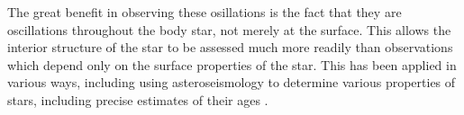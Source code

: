 \documentclass[11pt]{amsart}
\begin{document}
The great benefit in observing these osillations is the fact that they are oscillations throughout the body star, not merely at the surface.  This allows the interior structure of the star to be assessed much more readily than observations which depend only on the surface properties of the star.  This has been applied in various ways, including using asteroseismology to determine various properties of stars, including precise estimates of their ages \cite{Cunha2007} \cite{Chaplin2013}.












\end{document}
